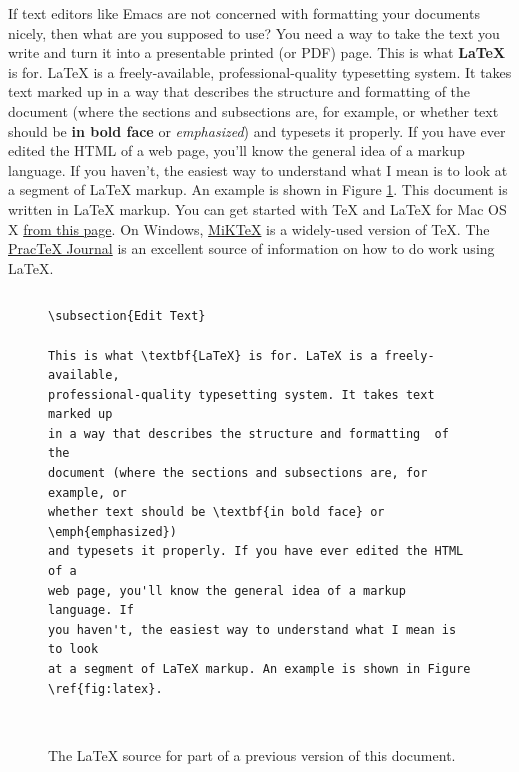 \documentclass[11pt,article,oneside]{memoir}
\begin{document}
If text editors like Emacs are not concerned with formatting your documents nicely, then what are you supposed to use? You need a way to take the text you write and turn it into a presentable printed (or PDF) page. This is what \textbf{LaTeX} is for. LaTeX is a freely-available, professional-quality typesetting system. It takes text marked up in a way that describes the structure and formatting  of the document (where the sections and subsections are, for example, or whether text should be \textbf{in bold face} or \emph{emphasized}) and typesets it properly. If you have ever edited the HTML of a web page, you'll know the general idea of a markup language. If you haven't, the easiest way to understand what I mean is to look at a segment of LaTeX markup. An example is shown in Figure \ref{fig:latex}. This document is written in LaTeX markup. You can get started with TeX and LaTeX for Mac OS X \href{http://tug.org/mactex/}{from this page}. On Windows, \href{http://www.miktex.org/}{MiKTeX} is a widely-used version of TeX. The \href{http://www.tug.org/pracjourn/}{PracTeX Journal} is an excellent source of information on how to do work using LaTeX. 

\begin{figure}
\begin{lstlisting}[style=sweave-top]
\end{lstlisting}
\begin{lstlisting}[language={[latex]tex},numbers=none,style=sweave-tex]
\subsection{Edit Text}

This is what \textbf{LaTeX} is for. LaTeX is a freely-available, 
professional-quality typesetting system. It takes text marked up 
in a way that describes the structure and formatting  of the 
document (where the sections and subsections are, for example, or 
whether text should be \textbf{in bold face} or \emph{emphasized}) 
and typesets it properly. If you have ever edited the HTML of a 
web page, you'll know the general idea of a markup language. If 
you haven't, the easiest way to understand what I mean is to look 
at a segment of LaTeX markup. An example is shown in Figure \ref{fig:latex}.
 
\end{lstlisting}
\begin{lstlisting}[style=sweave-bottom]
\end{lstlisting}
\caption{The LaTeX source for part of a previous version of this document.}
\label{fig:latex}
\end{figure}
\end{document}
